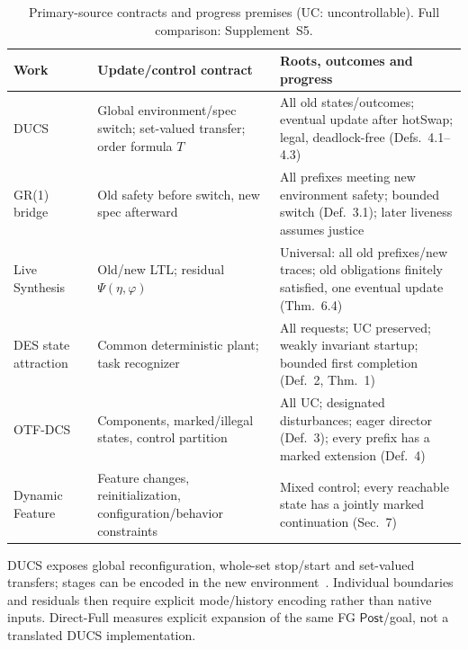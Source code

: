 \documentclass[acmsmall,screen,review,anonymous]{acmart}
\newcommand{\Post}{\mathsf{Post}}
\begin{document}
\begin{table}[!htbp]
\caption{Primary-source contracts and progress premises (UC: uncontrollable). Full comparison: Supplement~S5.}
\label{tab:closest-native}
\centering\footnotesize
\setlength{\tabcolsep}{3pt}\renewcommand{\arraystretch}{1.02}
\begin{tabular}{@{}>{\raggedright\arraybackslash}p{.16\linewidth}>{\raggedright\arraybackslash}p{.34\linewidth}>{\raggedright\arraybackslash}p{.46\linewidth}@{}}
\toprule
Work & Update/control contract & Roots, outcomes and progress\\
\midrule
DUCS~\cite{Nahabedian2020,Nahabedian2016SEAMS}
& Global environment/spec switch; set-valued transfer; order formula $T$
& All old states/outcomes; eventual update after hotSwap; legal, deadlock-free (Defs.~4.1--4.3)\\
GR(1) bridge~\cite{Amram2022GR1DynamicUpdate}
& Old safety before switch, new spec afterward
& All prefixes meeting new environment safety; bounded switch (Def.~3.1); later liveness assumes justice\\
Live Synthesis~\cite{FinkbeinerEtAl2022LiveSynthesis}
& Old/new LTL; residual $\Psi(\eta,\varphi)$
& Universal: all old prefixes/new traces; old obligations finitely satisfied, one eventual update (Thm.~6.4)\\
DES state attraction~\cite{NooruldeenSchmidt2015}
& Common deterministic plant; task recognizer
& All requests; UC preserved; weakly invariant startup; bounded first completion (Def.~2, Thm.~1)\\
OTF-DCS~\cite{CiolekEtAl2023OTFDCS}
& Components, marked/illegal states, control partition
& All UC; designated disturbances; eager director (Def.~3); every prefix has a marked extension (Def.~4)\\
Dynamic Feature~\cite{ThuijsmanReniers2024DynamicFeature}
& Feature changes, reinitialization, configuration/behavior constraints
& Mixed control; every reachable state has a jointly marked continuation (Sec.~7)\\
\bottomrule
\end{tabular}
\end{table}

DUCS exposes global reconfiguration, whole-set stop/start and set-valued transfers; stages can be encoded in the new environment~\cite[Sec.~4.2, Defs.~4.1--4.2]{Nahabedian2020}. Individual boundaries and residuals then require explicit mode/history encoding rather than native inputs. Direct-Full measures explicit expansion of the same FG $\Post$/goal, not a translated DUCS implementation.
\end{document}
